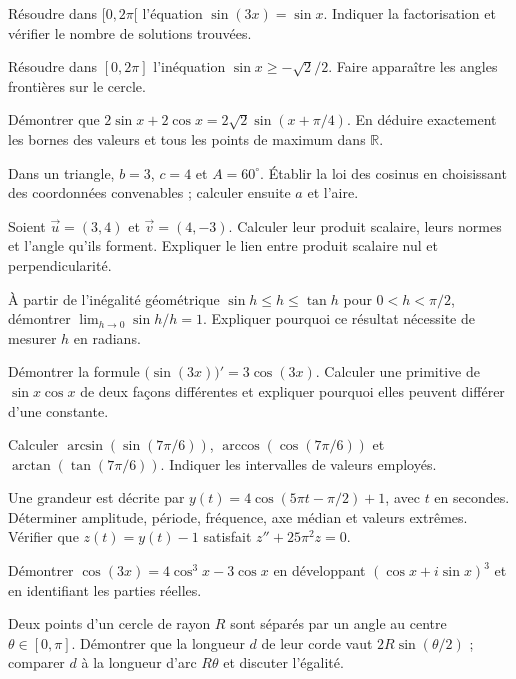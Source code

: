 Résoudre dans $[0,2\pi[$ l'équation $\sin(3x)=\sin x$. Indiquer la factorisation et vérifier le nombre de solutions trouvées.

Résoudre dans $[0,2\pi]$ l'inéquation $\sin x\ge-\sqrt2/2$. Faire apparaître les angles frontières sur le cercle.

Démontrer que $2\sin x+2\cos x=2\sqrt2\sin(x+\pi/4)$. En déduire exactement les bornes des valeurs et tous les points de maximum dans $\mathbb R$.

Dans un triangle, $b=3$, $c=4$ et $A=60^\circ$. Établir la loi des cosinus en choisissant des coordonnées convenables ; calculer ensuite $a$ et l'aire.

Soient $\vec u=(3,4)$ et $\vec v=(4,-3)$. Calculer leur produit scalaire, leurs normes et l'angle qu'ils forment. Expliquer le lien entre produit scalaire nul et perpendicularité.

À partir de l'inégalité géométrique $\sin h\le h\le\tan h$ pour $0<h<\pi/2$, démontrer $\lim_{h\to0}\sin h/h=1$. Expliquer pourquoi ce résultat nécessite de mesurer $h$ en radians.

Démontrer la formule $\bigl(\sin(3x)\bigr)'=3\cos(3x)$. Calculer une primitive de $\sin x\cos x$ de deux façons différentes et expliquer pourquoi elles peuvent différer d'une constante.

Calculer $\arcsin(\sin(7\pi/6))$, $\arccos(\cos(7\pi/6))$ et $\arctan(\tan(7\pi/6))$. Indiquer les intervalles de valeurs employés.

Une grandeur est décrite par $y(t)=4\cos(5\pi t-\pi/2)+1$, avec $t$ en secondes. Déterminer amplitude, période, fréquence, axe médian et valeurs extrêmes. Vérifier que $z(t)=y(t)-1$ satisfait $z''+25\pi^2z=0$.

Démontrer $\cos(3x)=4\cos^3x-3\cos x$ en développant $(\cos x+i\sin x)^3$ et en identifiant les parties réelles.

Deux points d'un cercle de rayon $R$ sont séparés par un angle au centre $\theta\in[0,\pi]$. Démontrer que la longueur $d$ de leur corde vaut $2R\sin(\theta/2)$ ; comparer $d$ à la longueur d'arc $R\theta$ et discuter l'égalité.
